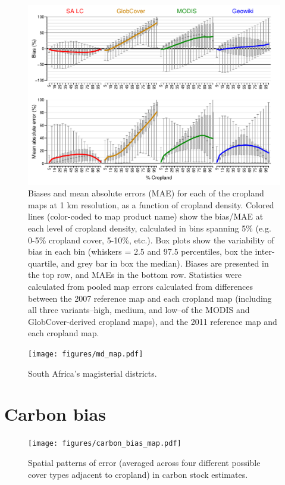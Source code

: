 \documentclass[12pt]{iopart}
\begin{document}
\begin{figure}[ht]
  \centering
     \includegraphics[width = 12cm]{figures/biases_1km.pdf} 
      \caption{Biases and mean absolute errors (MAE) for each of the cropland maps at 1 km resolution, as a function of cropland density. Colored lines (color-coded to map product name) show the bias/MAE at each level of cropland density, calculated in bins spanning 5\% (e.g. 0-5\% cropland cover, 5-10\%, etc.). Box plots show the variability of bias in each bin (whiskers = 2.5 and 97.5 percentiles, box the inter-quartile, and grey bar in box the median). Biases are presented in the top row, and MAEs in the bottom row. Statistics were calculated from pooled map errors calculated from differences between the 2007 reference map and each cropland map (including all three variants--high, medium, and low--of the MODIS and GlobCover-derived cropland maps), and the 2011 reference map and each cropland map. }
      \label{fig:default}
\end{figure}

\begin{figure}[ht]
  \centering
     \texttt{[image: figures/md\_map.pdf]} 
      \caption{South Africa's magisterial districts.}
      \label{fig:default}
\end{figure}

\FloatBarrier
\section*{Carbon bias}
\begin{figure}[ht]
  \centering
     \texttt{[image: figures/carbon\_bias\_map.pdf]} 
      \caption{Spatial patterns of error (averaged across four different possible cover types adjacent to cropland) in carbon stock estimates. }
      \label{fig:default}
\end{figure}
\end{document}
